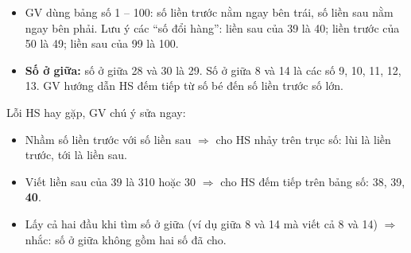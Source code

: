 \documentclass[../main.tex]{subfiles}
\begin{document}
\begin{itemize}
    \item GV dùng bảng số 1 -- 100: số liền trước nằm ngay bên trái, số liền sau nằm ngay bên phải. Lưu ý các “số đổi hàng”: liền sau của 39 là 40; liền trước của 50 là 49; liền sau của 99 là 100.
    \item \textbf{Số ở giữa:} số ở giữa 28 và 30 là 29. Số ở giữa 8 và 14 là các số 9, 10, 11, 12, 13. GV hướng dẫn HS đếm tiếp từ số bé đến số liền trước số lớn.
\end{itemize}
\begin{luuy}
    Lỗi HS hay gặp, GV chú ý sửa ngay:
    \begin{itemize}
        \item Nhầm số liền trước với số liền sau $\Rightarrow$ cho HS nhảy trên trục số: lùi là liền trước, tới là liền sau.
        \item Viết liền sau của 39 là 310 hoặc 30 $\Rightarrow$ cho HS đếm tiếp trên bảng số: 38, 39, \textbf{40}.
        \item Lấy cả hai đầu khi tìm số ở giữa (ví dụ giữa 8 và 14 mà viết cả 8 và 14) $\Rightarrow$ nhắc: số ở giữa không gồm hai số đã cho.
    \end{itemize}
\end{luuy}

\end{document}
